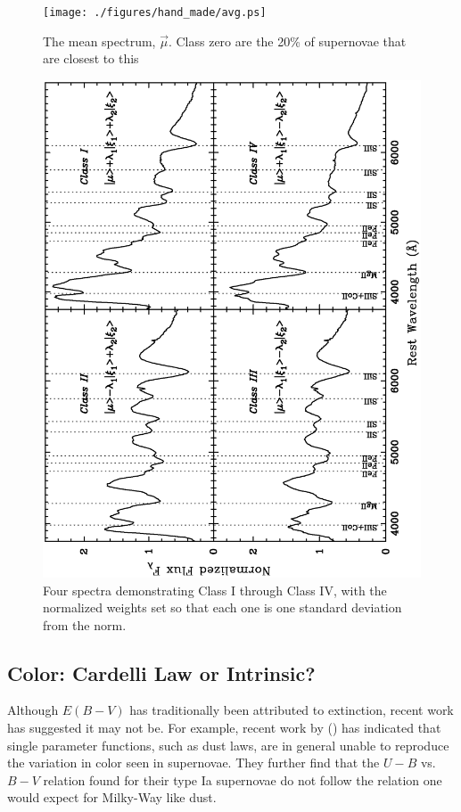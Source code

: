 \begin{figure}[ht]
\begin{center}
\texttt{[image: ./figures/hand\_made/avg.ps]}
\end{center}
\caption{
The mean spectrum, $\vec{\mu}$. Class zero are the 20\% of supernovae that are closest to this 
}
\label{fig:classzero}
\end{figure}

\begin{figure}[ht]
\begin{center}
\includegraphics[angle=-90,scale=0.66]{./figures/pca/4class_areanorm.ps}
\end{center}
\caption{
Four spectra demonstrating Class I through Class IV, with the normalized weights set so that each one is one standard deviation from the norm.
}
\label{fig:fourclasses}
\end{figure}

\subsection{Color: Cardelli Law or Intrinsic?}
Although $E(B-V)$ has traditionally been attributed to extinction, recent work has suggested it may not be. For example, recent work by \citeauthor{conley08a} (\citeyear{conley08a}) has indicated that single parameter functions, such as dust laws, are in general unable to reproduce the variation in color seen in supernovae. They further find that the $U - B$ vs. $B - V$ relation found for their type Ia supernovae do not follow the relation one would expect for Milky-Way like dust.

